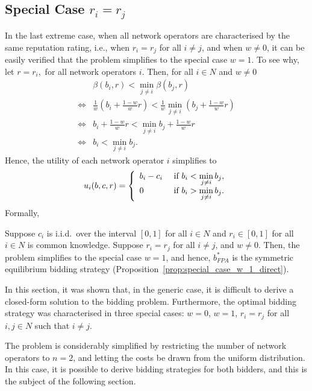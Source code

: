 \subsection{Special Case $r_i=r_j$} %
\label{sub:special_case_r_i_r_j_direct}
In the last extreme case, when all network operators are characterised by the same reputation rating, i.e., when $r_i = r_j$ for all $i\neq j$, and when $w\neq 0$, it can be easily verified that the problem simplifies to the special case $w=1$. To see why, let $r = r_i,$ for all network operators $i$. Then, for all $i\in N$ and $w\neq 0$
\begin{align}
	&\beta(b_i, r) < \min_{j\neq i} \beta(b_j, r)\\\nonumber
	\iff &\frac{1}{w} \left(b_i + \frac{1-w}{w} r\right) < \frac{1}{w} \min_{j\neq i} \left(b_j + \frac{1-w}{w} r\right)\\\nonumber
	\iff &b_i + \frac{1-w}{w} r < \min_{j\neq i} b_j + \frac{1-w}{w} r\\\nonumber
	\iff &b_i < \min_{j\neq i} b_j.
\end{align}
Hence, the utility of each network operator $i$ simplifies to
\begin{equation}
	u_i(b,c,r) = \left\{
	\begin{array}{l l}
		b_i - c_i &\text{ if } b_i < \displaystyle\min_{j\neq i} b_j,\\
		0 &\text{ if } b_i > \displaystyle\min_{j\neq i} b_j.
	\end{array}
	\right.
\end{equation}
Formally,
\begin{corollary}
\label{cor:special_case_r_i_r_j_direct}
Suppose $c_i$ is i.i.d.~over the interval $[0,1]$ for all $i\in N$ and $r_i\in [0,1]$ for all $i\in N$ is common knowledge. Suppose $r_i = r_j$ for all $i\neq j$, and $w\neq 0$. Then, the problem simplifies to the special case $w=1$, and hence, $b^*_{FPA}$ is the symmetric equilibrium bidding strategy (Proposition~\ref{prop:special_case_w_1_direct}).
\end{corollary}

In this section, it was shown that, in the generic case, it is difficult to derive a closed-form solution to the bidding problem. Furthermore, the optimal bidding strategy was characterised in three special cases: $w=0$, $w=1$, $r_i=r_j$ for all $i,j\in N$ such that $i\neq j$.

The problem is considerably simplified by restricting the number of network operators to $n=2$, and letting the costs be drawn from the uniform distribution. In this case, it is possible to derive bidding strategies for both bidders, and this is the subject of the following section.

